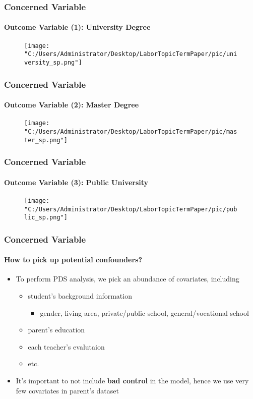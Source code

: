\documentclass{beamer}
\begin{document}
\begin{frame} %
\frametitle{Concerned Variable}
\framesubtitle{Outcome Variable (1): University Degree}

    \begin{figure}
        \centering
        \texttt{[image: "C:/Users/Administrator/Desktop/LaborTopicTermPaper/pic/university\_sp.png"]}
    \end{figure}

\end{frame}


\begin{frame} %
\frametitle{Concerned Variable}
\framesubtitle{Outcome Variable (2): Master Degree}

    \begin{figure}
        \centering
        \texttt{[image: "C:/Users/Administrator/Desktop/LaborTopicTermPaper/pic/master\_sp.png"]}
    \end{figure}

\end{frame}


\begin{frame} %
\frametitle{Concerned Variable}
\framesubtitle{Outcome Variable (3): Public University}

    \begin{figure}
        \centering
        \label{Fig.sub.1}
        \texttt{[image: "C:/Users/Administrator/Desktop/LaborTopicTermPaper/pic/public\_sp.png"]}
    \end{figure}

\end{frame}


\begin{frame} %
\frametitle{Concerned Variable}
\framesubtitle{How to pick up potential confounders?}

    \begin{itemize}
        \item To perform PDS analysis, we pick an abundance of covariates, including 
            \begin{itemize}
                \item student's background information
                \begin{itemize}
                    \item gender, living area, private/public school, general/vocational school
                \end{itemize}        
                \item parent's education
                \item each teacher's evalutaion 
                \item etc. 
            \end{itemize}
        \item It's important to not include \textbf{bad control} in the model, hence we use very few covariates in parent's dataset
    \end{itemize}

\end{frame}
\end{document}
